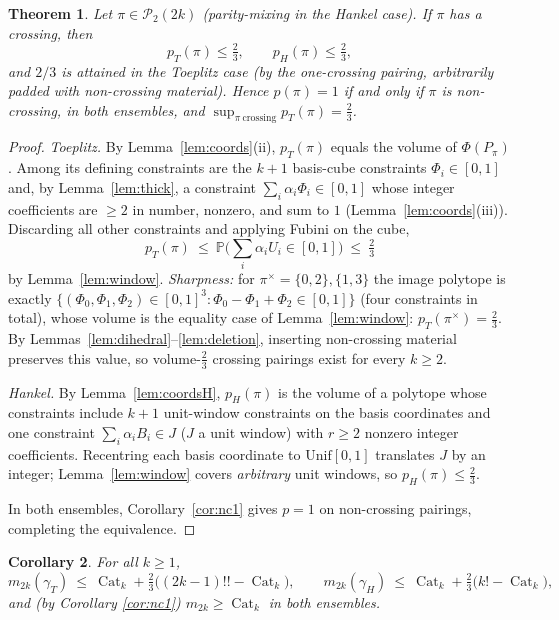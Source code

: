 ﻿\documentclass[11pt]{article}
\newtheorem{theorem}{Theorem}[section]
\newtheorem{corollary}[theorem]{Corollary}
\theoremstyle{remark}
\newcommand{\Cat}{\operatorname{Cat}}
\newcommand{\PP}{\mathcal{P}_2}
\newcommand{\gT}{\gamma_T}
\newcommand{\gH}{\gamma_H}
\begin{document}
\begin{theorem}\label{thm:gap}
Let $\pi\in\PP(2k)$ (parity-mixing in the Hankel case). If $\pi$ has a crossing, then
\[
p_T(\pi)\le\tfrac23,\qquad p_H(\pi)\le\tfrac23 ,
\]
and $2/3$ is attained in the Toeplitz case (by the one-crossing pairing, arbitrarily
padded with non-crossing material). Hence $p(\pi)=1$ if and only if $\pi$ is
non-crossing, in both ensembles, and $\sup_{\pi\ \mathrm{crossing}}p_T(\pi)=\tfrac23$.
\end{theorem}

\begin{proof}
\emph{Toeplitz.} By Lemma~\ref{lem:coords}(ii), $p_T(\pi)$ equals the volume of
$\Phi(P_\pi)$. Among its defining constraints are the $k+1$ basis-cube constraints
$\Phi_i\in[0,1]$ and, by Lemma~\ref{lem:thick}, a constraint
$\sum_i\alpha_i\Phi_i\in[0,1]$ whose integer coefficients are $\ge2$ in number,
nonzero, and sum to $1$ (Lemma~\ref{lem:coords}(iii)). Discarding all other
constraints and applying Fubini on the cube,
\[
p_T(\pi)\ \le\ \mathbb{P}\Big(\sum_i\alpha_iU_i\in[0,1]\Big)\ \le\ \tfrac23
\]
by Lemma~\ref{lem:window}. \emph{Sharpness:} for $\pi^\times=\{0,2\},\{1,3\}$ the
image polytope is exactly
$\{(\Phi_0,\Phi_1,\Phi_2)\in[0,1]^3:\Phi_0-\Phi_1+\Phi_2\in[0,1]\}$ (four
constraints in total), whose volume is the equality case of
Lemma~\ref{lem:window}: $p_T(\pi^\times)=\tfrac23$. By
Lemmas~\ref{lem:dihedral}--\ref{lem:deletion}, inserting non-crossing material
preserves this value, so volume-$\tfrac23$ crossing pairings exist for every
$k\ge2$.

\emph{Hankel.} By Lemma~\ref{lem:coordsH}, $p_H(\pi)$ is the volume of a polytope
whose constraints include $k+1$ unit-window constraints on the basis coordinates
and one constraint $\sum_i\alpha_i B_i\in J$ ($J$ a unit window) with $r\ge2$
nonzero integer coefficients. Recentring each basis coordinate to
$\mathrm{Unif}[0,1]$ translates $J$ by an integer; Lemma~\ref{lem:window} covers
\emph{arbitrary} unit windows, so $p_H(\pi)\le\tfrac23$.

In both ensembles, Corollary~\ref{cor:nc1} gives $p=1$ on non-crossing pairings,
completing the equivalence.
\end{proof}

\begin{corollary}\label{cor:bound}
For all $k\ge1$,
\[
m_{2k}(\gT)\ \le\ \Cat_k+\tfrac23\big((2k-1)!!-\Cat_k\big),\qquad
m_{2k}(\gH)\ \le\ \Cat_k+\tfrac23\big(k!-\Cat_k\big),
\]
and (by Corollary \ref{cor:nc1}) $m_{2k}\ge\Cat_k$ in both ensembles.
\end{corollary}
\end{document}
